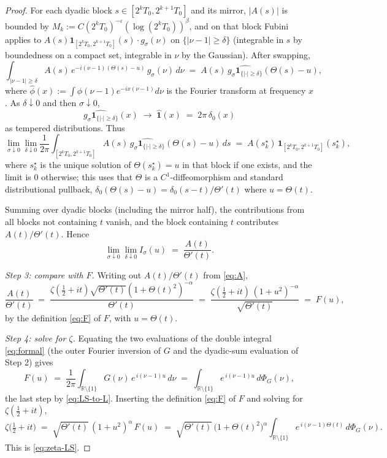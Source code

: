 \documentclass[11pt]{article}
\begin{document}
\begin{proof}
For each dyadic block $s\in[2^k T_0,2^{k+1}T_0]$ and its mirror, $|A(s)|$ is bounded by $M_k:=C(2^kT_0)^{-\varepsilon}(\log(2^kT_0))^\beta$, and on that block Fubini applies to $A(s)\mathbf 1_{[2^kT_0,2^{k+1}T_0]}(s)\cdot g_\sigma(\nu)$ on $\{|\nu-1|\ge\delta\}$ (integrable in $s$ by boundedness on a compact set, integrable in $\nu$ by the Gaussian). After swapping,
\begin{equation}\label{eq:after-swap}
\int_{|\nu-1|\ge\delta}\!A(s)\,e^{-i(\nu-1)(\Theta(s)-u)}\,g_\sigma(\nu)\,d\nu
\;=\; A(s)\,\widehat{g_\sigma\mathbf 1_{\{|\cdot|\ge\delta\}}}(\Theta(s)-u),
\end{equation}
where $\widehat{\phi}(x):=\int \phi(\nu-1)e^{-ix(\nu-1)}d\nu$ is the Fourier transform at frequency $x$. As $\delta\downarrow 0$ and then $\sigma\downarrow 0$,
\[
\widehat{g_\sigma\mathbf 1_{\{|\cdot|\ge\delta\}}}(x)\;\longrightarrow\;\widehat{\mathbf 1}(x)\;=\;2\pi\,\delta_0(x)
\]
as tempered distributions. Thus
\begin{equation}\label{eq:dyadic-limit}
\lim_{\sigma\downarrow 0}\lim_{\delta\downarrow 0}\frac{1}{2\pi}\int_{[2^kT_0,2^{k+1}T_0]} A(s)\,\widehat{g_\sigma\mathbf 1_{\{|\cdot|\ge\delta\}}}(\Theta(s)-u)\,ds
\;=\; A(s_k^\star)\,\mathbf 1_{[2^kT_0,2^{k+1}T_0]}(s_k^\star),
\end{equation}
where $s_k^\star$ is the unique solution of $\Theta(s_k^\star)=u$ in that block if one exists, and the limit is $0$ otherwise; this uses that $\Theta$ is a $C^1$-diffeomorphism and standard distributional pullback, $\delta_0(\Theta(s)-u)=\delta_0(s-t)/\Theta'(t)$ where $u=\Theta(t)$.

Summing over dyadic blocks (including the mirror half), the contributions from all blocks not containing $t$ vanish, and the block containing $t$ contributes $A(t)/\Theta'(t)$. Hence
\[
\lim_{\sigma\downarrow 0}\lim_{\delta\downarrow 0} I_\sigma(u) \;=\; \frac{A(t)}{\Theta'(t)}.
\]

\emph{Step 3: compare with $F$.} Writing out $A(t)/\Theta'(t)$ from \eqref{eq:A},
\[
\frac{A(t)}{\Theta'(t)}
\;=\; \frac{\zeta(\tfrac12+it)\sqrt{\Theta'(t)}(1+\Theta(t)^2)^{-\alpha}}{\Theta'(t)}
\;=\; \frac{\zeta(\tfrac12+it)\,(1+u^2)^{-\alpha}}{\sqrt{\Theta'(t)}}
\;=\; F(u),
\]
by the definition \eqref{eq:F} of $F$, with $u=\Theta(t)$.

\emph{Step 4: solve for $\zeta$.} Equating the two evaluations of the double integral \eqref{eq:formal} (the outer Fourier inversion of $G$ and the dyadic-sum evaluation of Step 2) gives
\begin{equation}\label{eq:F-from-G}
F(u) \;=\; \frac{1}{2\pi}\int_{\mathbb R\setminus\{1\}} G(\nu)\,e^{\,i(\nu-1)u}\,d\nu
\;=\; \int_{\mathbb R\setminus\{1\}} e^{\,i(\nu-1)u}\,d\Phi_G(\nu),
\end{equation}
the last step by \eqref{eq:LS-to-L}. Inserting the definition \eqref{eq:F} of $F$ and solving for $\zeta(\tfrac12+it)$,
\[
\zeta\!\bigl(\tfrac12+it\bigr)
\;=\;
\sqrt{\Theta'(t)}\,(1+u^2)^{\alpha}\,F(u)
\;=\;
\sqrt{\Theta'(t)}\,\bigl(1+\Theta(t)^2\bigr)^{\alpha}\!\int_{\mathbb R\setminus\{1\}} e^{\,i(\nu-1)\Theta(t)}\,d\Phi_G(\nu).
\]
This is \eqref{eq:zeta-LS}.
\end{proof}
\end{document}
